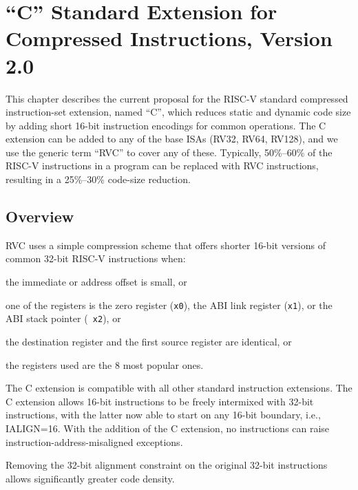 \chapter{``C'' Standard Extension for Compressed Instructions, Version
2.0}
\label{compressed}

This chapter describes the current proposal for the RISC-V
standard compressed instruction-set extension, named ``C'', which
reduces static and dynamic code size by adding short 16-bit
instruction encodings for common operations.  The C extension can be
added to any of the base ISAs (RV32, RV64, RV128), and we use the
generic term ``RVC'' to cover any of these.  Typically, 50\%--60\% of
the RISC-V instructions in a program can be replaced with RVC
instructions, resulting in a 25\%--30\% code-size reduction.

\section{Overview}

RVC uses a simple compression scheme that offers shorter 16-bit
versions of common 32-bit RISC-V instructions when:
\begin{tightlist}
	\item the immediate or address offset is small, or
	\item one of the registers is the zero register ({\tt x0}), the
      ABI link register ({\tt x1}), or the ABI stack pointer ({\tt
        x2}), or
	\item the destination register and the first source register are
      identical, or   
	\item the registers used are the 8 most popular ones. 
\end{tightlist}

The C extension is compatible with all other standard instruction
extensions.  The C extension allows 16-bit instructions to be freely
intermixed with 32-bit instructions, with the latter now able to start
on any 16-bit boundary, i.e., IALIGN=16.  With the addition of the C
extension, no instructions can raise instruction-address-misaligned
exceptions.

\begin{commentary}
Removing the 32-bit alignment constraint on the original 32-bit
instructions allows significantly greater code density.
\end{commentary}

